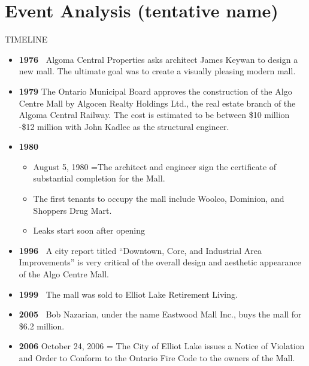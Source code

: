 \documentclass[12pt]{article}
\begin{document}
\section{Event Analysis (tentative name)} %

TIMELINE

\begin{itemize}
    \item \textbf{\textbf{1976 }}
Algoma Central Properties asks architect James Keywan to design a new mall. The ultimate goal was to create a visually pleasing modern mall. 

    \item \textbf{\textbf{1979}}
The Ontario Municipal Board approves the construction of the Algo Centre Mall by Algocen Realty Holdings Ltd., the real estate branch of the Algoma Central Railway. The cost is estimated to be between \$10 million -\$12 million with John Kadlec as the structural engineer.

    \item \textbf{\textbf{1980}}
    \begin{itemize}
        \item August 5, 1980 =The architect and engineer sign the certificate of substantial completion for the Mall.
        \item The first tenants to occupy the mall include Woolco, Dominion, and Shoppers Drug Mart.
        \item Leaks start soon after opening 
    \end{itemize}
    \item \textbf{\textbf{1996 }}
A city report titled “Downtown, Core, and Industrial Area Improvements” is very critical of the overall design and aesthetic appearance of the Algo Centre Mall.

    \item \textbf{\textbf{1999 }}
The mall was sold to Elliot Lake Retirement Living.

    \item \textbf{\textbf{2005 }}
Bob Nazarian, under the name Eastwood Mall Inc., buys the mall for \$6.2 million.

    \item \textbf{\textbf{2006}}
October 24, 2006 = The City of Elliot Lake issues a Notice of Violation and Order to Conform to the Ontario Fire Code to the owners of the Mall.


\end{itemize}
\end{document}

